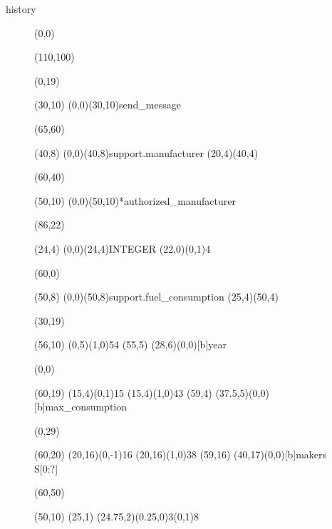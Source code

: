\documentclass{article}
\begin{document}
\begin{Mnamedesc}{history}
\begin{figure}[tbp]
\begin{picture}
{\begin{picture}
   \end{picture}}  %

 \put(0,0){\begin{picture}(110,100)

   \put(0,19){\begin{picture}(30,10)
     \put(0,0){\framebox(30,10){send\_message}}
     \end{picture}}

   \put(65,60){\begin{picture}(40,8)
     \put(0,0){(40,8){support.manufacturer}}
     \put(20,4){\oval(40,4)}
     \end{picture}}

   \put(60,40){\begin{picture}(50,10)
     \put(0,0){\framebox(50,10){*authorized\_manufacturer}}
     \end{picture}}

   \put(86,22){\begin{picture}(24,4)
     \put(0,0){\framebox(24,4){INTEGER}}
     \put(22,0){\line(0,1){4}}
     \end{picture}}

   \put(60,0){\begin{picture}(50,8)
     \put(0,0){(50,8){support.fuel\_consumption}}
     \put(25,4){\oval(50,4)}
     \end{picture}}

   \put(30,19){\begin{picture}(56,10)
     \put(0,5){\line(1,0){54}}
     \put(55,5){}
     \put(28,6){\makebox(0,0)[b]{year}}
     \end{picture}}

   \put(0,0){\begin{picture}(60,19)
     \put(15,4){\line(0,1){15}}
     \put(15,4){\line(1,0){43}}
     \put(59,4){}
     \put(37.5,5){\makebox(0,0)[b]{max\_consumption}}
     \end{picture}}

   \put(0,29){\begin{picture}(60,20)
     \put(20,16){\line(0,-1){16}}
     \put(20,16){\line(1,0){38}}
     \put(59,16){}
     \put(40,17){\makebox(0,0)[b]{makers S[0:?]}}
     \end{picture}}

   \put(60,50){\begin{picture}(50,10)
     \put(25,1){}
     \multiput(24.75,2)(0.25,0){3}{\line(0,1){8}}
     \end{picture}}


\end{picture}}
\end{picture}
\end{figure}
\end{Mnamedesc}
\end{document}
